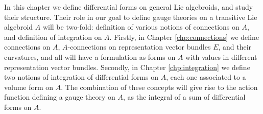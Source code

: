             
        
        
        


In this chapter we define differential forms on general Lie algebroids, and study their structure. Their role in our goal to define gauge theories on a transitive Lie algebroid $A$ will be two-fold: definition of various notions of connections on $A$, and definition of integration on $A$. Firstly, in Chapter \ref{chp:connections} we define connections on $A$, $A$-connections on representation vector bundles $E$, and their curvatures, and all will have a formulation as forms on $A$ with values in different representation vector bundles. Secondly, in Chapter \ref{chp:integration} we define two notions of integration of differential forms on $A$, each one associated to a volume form on $A$. The combination of these concepts will give rise to the action function defining a gauge theory on $A$, as the integral of a sum of differential forms on $A$. 

